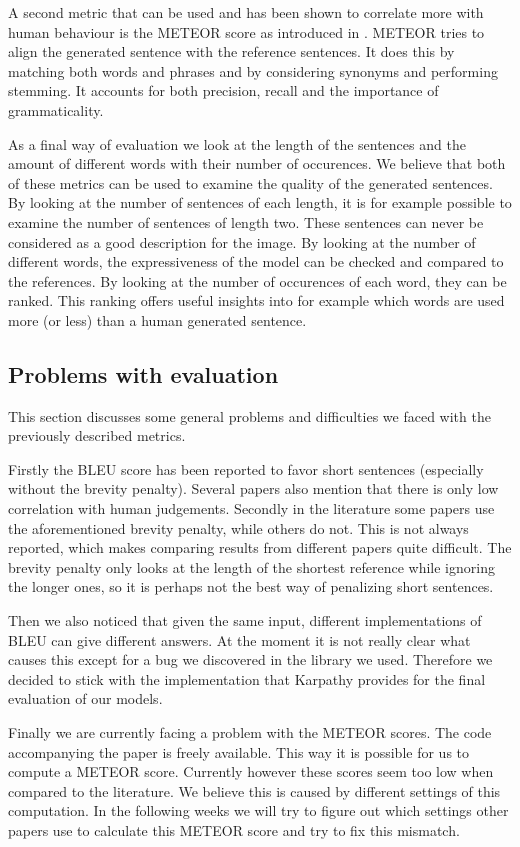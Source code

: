 \documentclass{article}
\begin{document}
A second metric that can be used and has been shown to correlate more with human behaviour is the METEOR score as introduced in \cite{Denkowski2007}. METEOR tries to align the generated sentence with the reference sentences. It does this by matching both words and phrases and by considering synonyms and performing stemming. It accounts for both precision, recall and the importance of grammaticality.

As a final way of evaluation we look at the length of the sentences and the amount of different words with their number of occurences.
We believe that both of these metrics can be used to examine the quality of the generated sentences. By looking at the number of sentences of each length, it is for example possible to examine the number of sentences of length two. These sentences can never be considered as a good description for the image. By looking at the number of different words, the expressiveness of the model can be checked and compared to the references. By looking at the number of occurences of each word, they can be ranked. This ranking offers useful insights into for example which words are used more (or less) than a human generated sentence. 

\subsection{Problems with evaluation}
This section discusses some general problems and difficulties we faced with the previously described metrics.

Firstly the BLEU score has been reported to favor short sentences (especially without the brevity penalty). Several papers also mention that there is only low correlation with human judgements.
Secondly in the literature some papers use the aforementioned brevity penalty, while others do not. This is not always reported, which makes comparing results from different papers quite difficult.
The brevity penalty only looks at the length of the shortest reference while ignoring the longer ones, so it is perhaps not the best way of penalizing short sentences.

Then we also noticed that given the same input, different implementations of BLEU can give different answers. At the moment it is not really clear what causes this except for a bug we discovered in the library we used.
Therefore we decided to stick with the implementation that Karpathy provides for the final evaluation of our models.

Finally we are currently facing a problem with the METEOR scores. The code accompanying the paper is freely available.
This way it is possible for us to compute a METEOR score. Currently however these scores seem too low when compared to the literature.
We believe this is caused by different settings of this computation. In the following weeks we will try to figure out which settings other papers use to calculate this METEOR score and try to fix this mismatch.
\end{document}
